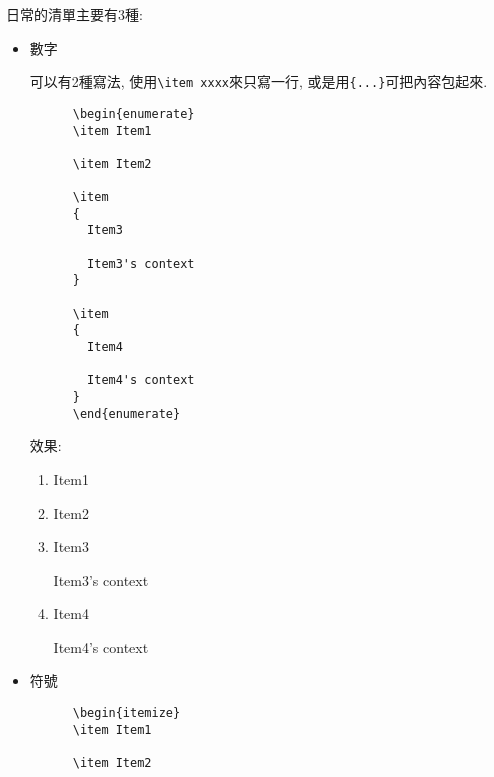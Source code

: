 
  日常的清單主要有3種:

\begin{itemize}
  \item
  {
    數字

    可以有2種寫法, 使用\verb|\item xxxx|來只寫一行, 或是用\verb|{...}|可把內容包起來.
    \begin{framed}
    \begin{verbatim}
      \begin{enumerate}
      \item Item1

      \item Item2

      \item
      {
        Item3

        Item3's context
      }

      \item
      {
        Item4

        Item4's context
      }
      \end{enumerate}
    \end{verbatim}
    \end{framed}

    效果:
    \begin{enumerate}
      \item Item1

      \item Item2

      \item
      {
        Item3

        Item3's context
      }

      \item
      {
        Item4

        Item4's context
      }
    \end{enumerate}
  } %

  \newpage
  \item
  {
    符號

    \begin{framed}
    \begin{verbatim}
      \begin{itemize}
      \item Item1

      \item Item2


\end{verbatim}
\end{framed}}
\end{itemize}

